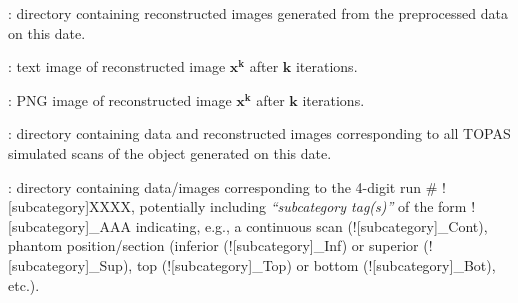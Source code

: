 \begin{tcbenvironment}
\begin{tcbenumbox}
\begin{ThinEnum}
\begin{ThinEnum}
\begin{ThinEnum}
\begin{ThinEnum}
\begin{ThinEnum}
\begin{ThinEnum}
\begin{ThinEnum}
\begin{ThinEnum}
\begin{ThinEnum}
                                        \begin{ThinEnum}
                                            \item {} : directory containing reconstructed images generated from the preprocessed data on this date.
                                                \begin{ThinEnum}
                                                    \item {} : text image of reconstructed image $\boldsymbol{x^k}$ after $\boldsymbol{k}$ iterations.
                                                    \item {} : PNG image of reconstructed image $\boldsymbol{x^k}$ after $\boldsymbol{k}$ iterations.
                                                \end{ThinEnum}%
                                        \end{ThinEnum}%
                                    \end{ThinEnum}%
                                \end{ThinEnum}%
                            \end{ThinEnum}%
                        \end{ThinEnum}%
                    \end{ThinEnum}%
                \end{ThinEnum}%
                \item {} : directory containing data and reconstructed images corresponding to all TOPAS simulated scans of the object generated on this date.
                \begin{ThinEnum}
                \item {} : directory containing data/images corresponding to the 4-digit run \# \docentry![subcategory]{XXXX}, potentially including \emph{``subcategory tag(s)''} of the form \docentry![subcategory]{\_AAA} indicating, e.g., a continuous scan (\docentry![subcategory]{\_Cont}), phantom position/section (inferior (\docentry![subcategory]{\_Inf}) or superior (\docentry![subcategory]{\_Sup}), top (\docentry![subcategory]{\_Top}) or bottom (\docentry![subcategory]{\_Bot}), etc.).
                    \begin{ThinEnum}

\end{ThinEnum}
\end{ThinEnum}
\end{ThinEnum}
\end{ThinEnum}
\end{ThinEnum}
\end{tcbenumbox}
\end{tcbenvironment}
